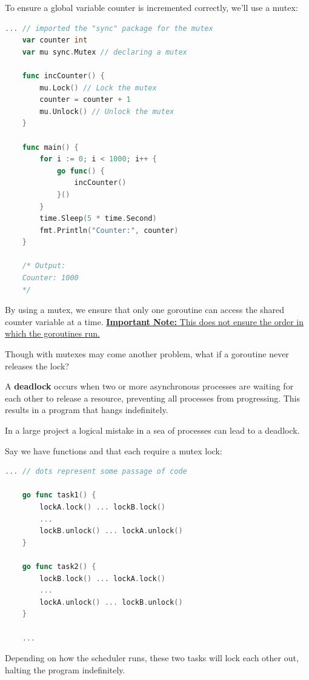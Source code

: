 \begin{Def}

    To ensure a global variable counter is incremented correctly, we'll use a mutex:
    \begin{lstlisting}[language=Go, caption=Using a Mutex to Increment a Counter Variable, label={lst:mutex}, numbers=none]
    ... // imported the "sync" package for the mutex
    var counter int
    var mu sync.Mutex // declaring a mutex

    func incCounter() {
        mu.Lock() // Lock the mutex
        counter = counter + 1
        mu.Unlock() // Unlock the mutex
    }

    func main() {
        for i := 0; i < 1000; i++ {
            go func() {
                incCounter()
            }()
        }
        time.Sleep(5 * time.Second)
        fmt.Println("Counter:", counter)
    }

    /* Output:
    Counter: 1000
    */
    \end{lstlisting}

    \noindent
    By using a mutex, we ensure that only one goroutine can access the shared counter variable at a time.
    \underline{\textbf{Important Note:} This does not ensure the order in which the goroutines run.}
\end{Def}

\noindent
Though with mutexes may come another problem, what if a goroutine never releases the lock?
\begin{Def}[Deadlock]

    A \textbf{deadlock} occurs when two or more asynchronous processes are waiting for each other to release a resource, preventing all processes from progressing. This results in a program that hangs indefinitely.
\end{Def}
\noindent
In a large project a logical mistake in a sea of processes can lead to a deadlock. 

\newpage

\noindent
\begin{Example}
    
    Say we have functions  and  that each require a mutex lock:
    \begin{lstlisting}[language=Go, caption=Deadlock Scenario, label={lst:deadlock}, numbers=none]
    ... // dots represent some passage of code

    go func task1() {
        lockA.lock() ... lockB.lock()
        ...
        lockB.unlock() ... lockA.unlock()
    }

    go func task2() {
        lockB.lock() ... lockA.lock()
        ...
        lockA.unlock() ... lockB.unlock()
    }
    
    ...
    \end{lstlisting}
    Depending on how the scheduler runs, these two tasks will lock each other out, halting the program indefinitely.
\end{Example}


